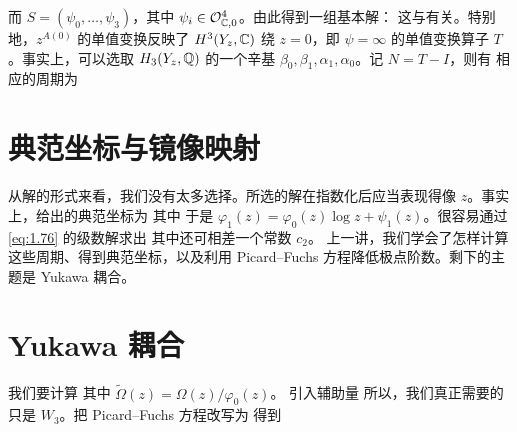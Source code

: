 而 $S=(\psi_0,\ldots,\psi_3)$，其中 $\psi_i\in\mathcal O_{\mathbb C,0}^4$。由此得到一组基本解：
这与有关。特别地，$z^{A(0)}$ 的单值变换反映了 $H^3(Y_z,\mathbb C)$ 绕 $z=0$，即 $\psi=\infty$ 的单值变换算子 $T$。事实上，可以选取 $H_3(Y_z,\mathbb Q)$ 的一个辛基 $\beta_0,\beta_1,\alpha_1,\alpha_0$。记 $N=T-I$，则有
相应的周期为
\section{典范坐标与镜像映射}
从解的形式来看，我们没有太多选择。所选的解在指数化后应当表现得像 $z$。事实上，给出的典范坐标为
其中
于是 $\varphi_1(z)=\varphi_0(z)\log z+\psi_1(z)$。很容易通过 \eqref{eq:1.76} 的级数解求出
其中还可相差一个常数 $c_2$。
上一讲，我们学会了怎样计算这些周期、得到典范坐标，以及利用 Picard–Fuchs 方程降低极点阶数。剩下的主题是 Yukawa 耦合。
\section{Yukawa 耦合}
我们要计算
其中 $\widetilde\Omega(z)=\Omega(z)/\varphi_0(z)$。
引入辅助量
所以，我们真正需要的只是 $W_3$。把 Picard–Fuchs 方程改写为
得到
